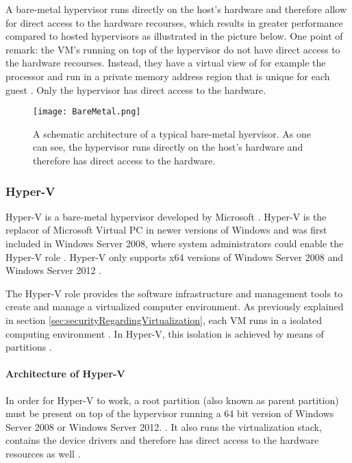 A bare-metal hypervisor runs directly on the host's hardware and therefore allow for direct access to the hardware recourses, which results in greater performance compared to hosted hypervisors \citep{Techtarget2} as illustrated in the picture below. One point of remark: the VM's running on top of the hypervisor do not have direct access to the hardware recourses. Instead, they have a virtual view of for example the processor and run in a private memory address region that is unique for each guest \citep{HyperVArch}. Only the hypervisor has direct access to the hardware.

\begin{figure}[h]
    \centering
    \texttt{[image: BareMetal.png]}
    \caption[Bare-metal hypervisor]{A schematic architecture of a typical bare-metal hyervisor. As one can see, the hypervisor runs directly on the host's hardware and therefore has direct access to the hardware.}
\end{figure}

\subsubsection{Hyper-V}

Hyper-V is a bare-metal hypervisor developed by Microsoft \citep{HyperV}. Hyper-V is the replacor of Microsoft Virtual PC in newer versions of Windows\citep{HyperVSuccessor} and was first included in Windows Server 2008, where system administrators could enable the Hyper-V role \citep{HyperV2}. Hyper-V only supports x64 versions of Windows Server 2008 and Windows Server 2012 \citep{HyperVArch}.

The Hyper-V role provides the software infrastructure and management tools to create and manage a virtualized computer environment. As previously explained in section \ref{sec:securityRegardingVirtualization}, each VM runs in a isolated computing environment \citep{HyperVOverview}. In Hyper-V, this isolation is achieved by means of partitions \citep{HyperVArch}.

\paragraph{Architecture of Hyper-V}

In order for Hyper-V to work, a root partition (also known as parent partition) must be present on top of the hypervisor running a 64 bit version of Windows Server 2008 or Windows Server 2012. \citep{HyperVArch}. It also runs the virtualization stack, contains the device drivers and therefore has direct access to the hardware resources as well \citep{HyperVArch2}.

